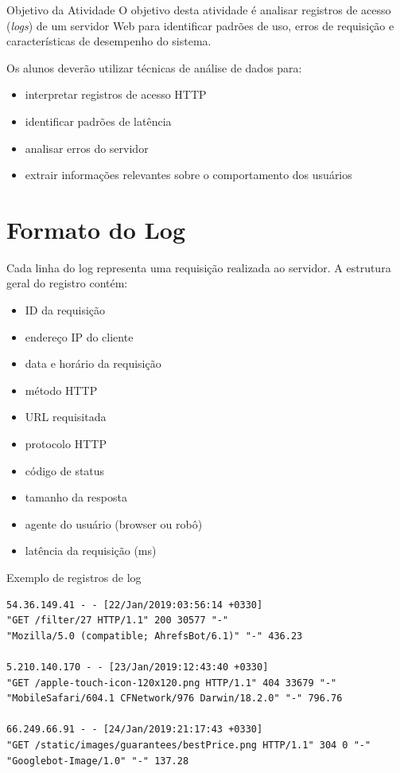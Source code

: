 \documentclass[12pt,a4paper]{report}
\begin{document}
\begin{block}{Objetivo da Atividade}
O objetivo desta atividade é analisar registros de acesso (\textit{logs}) de um servidor Web para identificar padrões de uso, erros de requisição e características de desempenho do sistema.

Os alunos deverão utilizar técnicas de análise de dados para:

\begin{itemize}
\item interpretar registros de acesso HTTP
\item identificar padrões de latência
\item analisar erros do servidor
\item extrair informações relevantes sobre o comportamento dos usuários
\end{itemize}

\end{block}

\section*{Formato do Log}

Cada linha do log representa uma requisição realizada ao servidor.  
A estrutura geral do registro contém:

\begin{itemize}
\item ID da requisição
\item endereço IP do cliente
\item data e horário da requisição
\item método HTTP
\item URL requisitada
\item protocolo HTTP
\item código de status
\item tamanho da resposta
\item agente do usuário (browser ou robô)
\item latência da requisição (ms)
\end{itemize}

\begin{block}{Exemplo de registros de log}

\small

\begin{verbatim}
54.36.149.41 - - [22/Jan/2019:03:56:14 +0330] 
"GET /filter/27 HTTP/1.1" 200 30577 "-" 
"Mozilla/5.0 (compatible; AhrefsBot/6.1)" "-" 436.23

5.210.140.170 - - [23/Jan/2019:12:43:40 +0330] 
"GET /apple-touch-icon-120x120.png HTTP/1.1" 404 33679 "-" 
"MobileSafari/604.1 CFNetwork/976 Darwin/18.2.0" "-" 796.76

66.249.66.91 - - [24/Jan/2019:21:17:43 +0330] 
"GET /static/images/guarantees/bestPrice.png HTTP/1.1" 304 0 "-" 
"Googlebot-Image/1.0" "-" 137.28
\end{verbatim}

\end{block}
\end{document}
